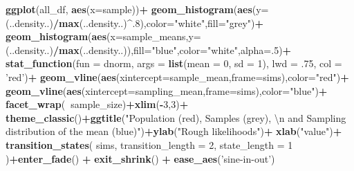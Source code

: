 \documentclass[
]{book}
\newenvironment{Shaded}{\begin{snugshade}}{\end{snugshade}}
\newcommand{\CharTok}[1]{\textcolor[rgb]{0.31,0.60,0.02}{#1}}
\newcommand{\DataTypeTok}[1]{\textcolor[rgb]{0.13,0.29,0.53}{#1}}
\newcommand{\DecValTok}[1]{\textcolor[rgb]{0.00,0.00,0.81}{#1}}
\newcommand{\FloatTok}[1]{\textcolor[rgb]{0.00,0.00,0.81}{#1}}
\newcommand{\KeywordTok}[1]{\textcolor[rgb]{0.13,0.29,0.53}{\textbf{#1}}}
\newcommand{\NormalTok}[1]{#1}
\newcommand{\OperatorTok}[1]{\textcolor[rgb]{0.81,0.36,0.00}{\textbf{#1}}}
\newcommand{\StringTok}[1]{\textcolor[rgb]{0.31,0.60,0.02}{#1}}
\begin{document}
\begin{Shaded}
\begin{Highlighting}[]
\KeywordTok{ggplot}\NormalTok{(all_df, }\KeywordTok{aes}\NormalTok{(}\DataTypeTok{x=}\NormalTok{sample))}\OperatorTok{+}
\StringTok{  }\KeywordTok{geom_histogram}\NormalTok{(}\KeywordTok{aes}\NormalTok{(}\DataTypeTok{y=}\NormalTok{(..density..)}\OperatorTok{/}\KeywordTok{max}\NormalTok{(..density..)}\OperatorTok{^}\NormalTok{.}\DecValTok{8}\NormalTok{),}\DataTypeTok{color=}\StringTok{"white"}\NormalTok{,}\DataTypeTok{fill=}\StringTok{"grey"}\NormalTok{)}\OperatorTok{+}
\StringTok{  }\KeywordTok{geom_histogram}\NormalTok{(}\KeywordTok{aes}\NormalTok{(}\DataTypeTok{x=}\NormalTok{sample_means,}\DataTypeTok{y=}\NormalTok{(..density..)}\OperatorTok{/}\KeywordTok{max}\NormalTok{(..density..)),}\DataTypeTok{fill=}\StringTok{"blue"}\NormalTok{,}\DataTypeTok{color=}\StringTok{"white"}\NormalTok{,}\DataTypeTok{alpha=}\NormalTok{.}\DecValTok{5}\NormalTok{)}\OperatorTok{+}
\StringTok{  }\KeywordTok{stat_function}\NormalTok{(}\DataTypeTok{fun =}\NormalTok{ dnorm, }
                \DataTypeTok{args =} \KeywordTok{list}\NormalTok{(}\DataTypeTok{mean =} \DecValTok{0}\NormalTok{, }\DataTypeTok{sd =} \DecValTok{1}\NormalTok{), }
                \DataTypeTok{lwd =} \FloatTok{.75}\NormalTok{, }
                \DataTypeTok{col =} \StringTok{'red'}\NormalTok{)}\OperatorTok{+}
\StringTok{  }\KeywordTok{geom_vline}\NormalTok{(}\KeywordTok{aes}\NormalTok{(}\DataTypeTok{xintercept=}\NormalTok{sample_mean,}\DataTypeTok{frame=}\NormalTok{sims),}\DataTypeTok{color=}\StringTok{"red"}\NormalTok{)}\OperatorTok{+}
\StringTok{  }\KeywordTok{geom_vline}\NormalTok{(}\KeywordTok{aes}\NormalTok{(}\DataTypeTok{xintercept=}\NormalTok{sampling_mean,}\DataTypeTok{frame=}\NormalTok{sims),}\DataTypeTok{color=}\StringTok{"blue"}\NormalTok{)}\OperatorTok{+}
\StringTok{  }\KeywordTok{facet_wrap}\NormalTok{(}\OperatorTok{~}\NormalTok{sample_size)}\OperatorTok{+}\KeywordTok{xlim}\NormalTok{(}\OperatorTok{-}\DecValTok{3}\NormalTok{,}\DecValTok{3}\NormalTok{)}\OperatorTok{+}
\StringTok{  }\KeywordTok{theme_classic}\NormalTok{()}\OperatorTok{+}\KeywordTok{ggtitle}\NormalTok{(}\StringTok{"Population (red), Samples (grey), }\CharTok{\textbackslash{}n}\StringTok{ and Sampling distribution of the mean (blue)"}\NormalTok{)}\OperatorTok{+}\KeywordTok{ylab}\NormalTok{(}\StringTok{"Rough likelihoods"}\NormalTok{)}\OperatorTok{+}
\StringTok{  }\KeywordTok{xlab}\NormalTok{(}\StringTok{"value"}\NormalTok{)}\OperatorTok{+}
\StringTok{  }\KeywordTok{transition_states}\NormalTok{(}
\NormalTok{    sims,}
    \DataTypeTok{transition_length =} \DecValTok{2}\NormalTok{,}
    \DataTypeTok{state_length =} \DecValTok{1}
\NormalTok{  )}\OperatorTok{+}\KeywordTok{enter_fade}\NormalTok{() }\OperatorTok{+}\StringTok{ }
\StringTok{  }\KeywordTok{exit_shrink}\NormalTok{() }\OperatorTok{+}
\StringTok{  }\KeywordTok{ease_aes}\NormalTok{(}\StringTok{'sine-in-out'}\NormalTok{)}
\end{Highlighting}
\end{Shaded}
\end{document}
